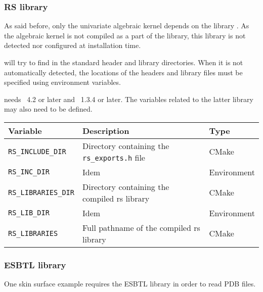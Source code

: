 \subsubsection{RS library}

As said before, only the \cgal{} univariate algebraic kernel depends on the
library \rs. As the algebraic kernel is not compiled as a part of the \cgal{}
library, this library is not detected nor configured at installation time.

\cmake{} will try to find \rs{} in the standard header and library
directories. When it is not automatically detected, the locations of the
headers and library files must be specified using environment variables.

\rs{} needs \gmp~4.2 or later and \mpfi~1.3.4 or later. The variables
related to the latter library may also need to be defined.

{\ccTexHtml{\small}{}
\renewcommand{\arraystretch}{1.3}
\gdef\lcTabularBorder{2}
\begin{tabular}{|l|l|l|} \hline
  \textbf{Variable}             & \textbf{Description}                                  & \textbf{Type}\\\hline\hline
  \texttt{RS\_INCLUDE\_DIR}     & Directory containing the \texttt{rs\_exports.h} file  & CMake\\\hline
  \texttt{RS\_INC\_DIR}         & Idem                                                  & Environment\\\hline
  \texttt{RS\_LIBRARIES\_DIR}   & Directory containing the compiled rs library          & CMake\\\hline
  \texttt{RS\_LIB\_DIR}         & Idem                                                  & Environment\\\hline
  \texttt{RS\_LIBRARIES}        & Full pathname of the compiled rs library              & CMake\\\hline
\end{tabular}
}


\subsubsection{ESBTL library}

One skin surface example requires the ESBTL library in order to read PDB files.

